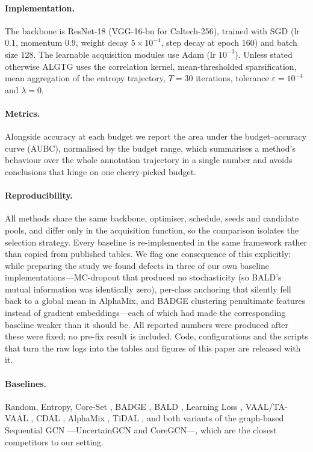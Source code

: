 \documentclass[11pt]{article}
\begin{document}
\paragraph{Implementation.} The backbone is ResNet-18 \citep{he2016deep} (VGG-16-bn for
Caltech-256), trained with SGD (lr $0.1$, momentum $0.9$, weight decay $5\times10^{-4}$,
step decay at epoch $160$) and batch size $128$. The learnable acquisition modules use Adam
(lr $10^{-3}$). Unless stated otherwise ALGTG uses the correlation kernel, mean-thresholded
sparsification, mean aggregation of the entropy trajectory, $T=30$ iterations, tolerance
$\varepsilon=10^{-4}$ and $\lambda=0$.

\paragraph{Metrics.} Alongside accuracy at each budget we report the area under the
budget--accuracy curve (AUBC), normalised by the budget range, which summarises a method's
behaviour over the whole annotation trajectory in a single number and avoids conclusions that
hinge on one cherry-picked budget.

\paragraph{Reproducibility.} All methods share the same backbone, optimiser, schedule, seeds
and candidate pools, and differ only in the acquisition function, so the comparison isolates
the selection strategy. Every baseline is re-implemented in the same framework rather than
copied from published tables. We flag one consequence of this explicitly: while preparing the
study we found defects in three of our own baseline implementations---MC-dropout that produced
no stochasticity (so BALD's mutual information was identically zero), per-class anchoring that
silently fell back to a global mean in AlphaMix, and BADGE clustering penultimate features
instead of gradient embeddings---each of which had made the corresponding baseline weaker than
it should be. All reported numbers were produced after these were fixed; no pre-fix result is
included. Code, configurations and the scripts that turn the raw logs into the tables and
figures of this paper are released with it.

\paragraph{Baselines.} Random, Entropy, Core-Set \citep{sener2018active},
BADGE \citep{ash2020deep}, BALD \citep{gal2017deep}, Learning Loss
\citep{yoo2019learning}, VAAL/TA-VAAL \citep{sinha2019variational,kim2021task},
CDAL \citep{agarwal2020contextual}, AlphaMix \citep{parvaneh2022active},
TiDAL \citep{kye2023tidal}, and both variants of the graph-based Sequential GCN
---UncertainGCN and CoreGCN---\citep{caramalau2021sequential}, which are the closest
competitors to our setting.
\end{document}
